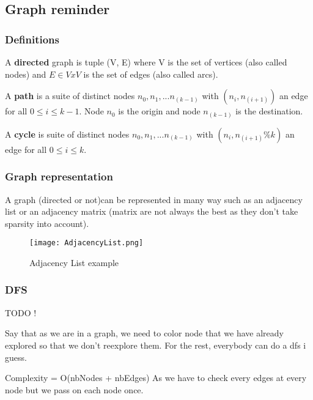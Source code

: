 
\subsection{Graph reminder}

\subsubsection{Definitions}

A \textbf{directed} graph is tuple (V, E) where V is the set of vertices (also
called nodes) and $E \in V x V$ is the set of edges (also called arcs).\newline

A \textbf{path} is a suite of distinct nodes $n_0, n_1, ... n_(k-1)$ with $(n_i, n_(i+1))$ an
edge for all $0 \leq i \le k-1$. Node $n_0$ is the origin and node $n_(k-1)$ is the
destination.\newline

A \textbf{cycle} is suite of distinct nodes  $n_0, n_1, ... n_(k-1)$ with $(n_i, n_(i+1)\% k)$ an edge for all $0 \leq i \le k$.

\subsubsection{Graph representation}

A graph (directed or not)can be represented in many way such as an adjacency list or an adjacency matrix (matrix are not always the best as they don't take sparsity into account).

\begin{figure}[!ht]
    \centering
    \texttt{[image: AdjacencyList.png]}
    \caption{Adjacency List example}
    \label{fig:AdjacencyList_example}
\end{figure}
\FloatBarrier

\subsubsection{DFS}

TODO ! \newline

Say that as we are in a graph, we need to color node that we have already explored so that we don't reexplore them. For the rest, everybody can do a dfs i guess.\newline

Complexity = O(nbNodes + nbEdges)\newline
As we have to check every edges at every node but we pass on each node once.

